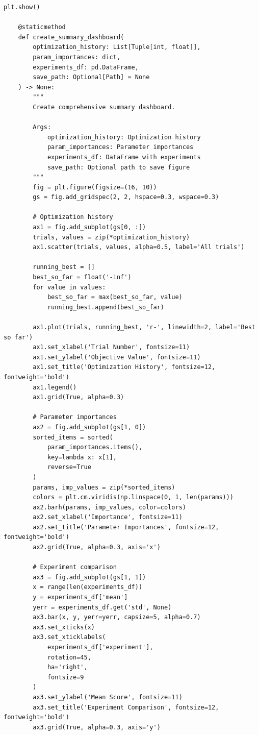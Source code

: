 \begin{lstlisting}[style=python, caption={Experiment dashboard generation}]
        plt.show()

    @staticmethod
    def create_summary_dashboard(
        optimization_history: List[Tuple[int, float]],
        param_importances: dict,
        experiments_df: pd.DataFrame,
        save_path: Optional[Path] = None
    ) -> None:
        """
        Create comprehensive summary dashboard.

        Args:
            optimization_history: Optimization history
            param_importances: Parameter importances
            experiments_df: DataFrame with experiments
            save_path: Optional path to save figure
        """
        fig = plt.figure(figsize=(16, 10))
        gs = fig.add_gridspec(2, 2, hspace=0.3, wspace=0.3)

        # Optimization history
        ax1 = fig.add_subplot(gs[0, :])
        trials, values = zip(*optimization_history)
        ax1.scatter(trials, values, alpha=0.5, label='All trials')

        running_best = []
        best_so_far = float('-inf')
        for value in values:
            best_so_far = max(best_so_far, value)
            running_best.append(best_so_far)

        ax1.plot(trials, running_best, 'r-', linewidth=2, label='Best so far')
        ax1.set_xlabel('Trial Number', fontsize=11)
        ax1.set_ylabel('Objective Value', fontsize=11)
        ax1.set_title('Optimization History', fontsize=12, fontweight='bold')
        ax1.legend()
        ax1.grid(True, alpha=0.3)

        # Parameter importances
        ax2 = fig.add_subplot(gs[1, 0])
        sorted_items = sorted(
            param_importances.items(),
            key=lambda x: x[1],
            reverse=True
        )
        params, imp_values = zip(*sorted_items)
        colors = plt.cm.viridis(np.linspace(0, 1, len(params)))
        ax2.barh(params, imp_values, color=colors)
        ax2.set_xlabel('Importance', fontsize=11)
        ax2.set_title('Parameter Importances', fontsize=12, fontweight='bold')
        ax2.grid(True, alpha=0.3, axis='x')

        # Experiment comparison
        ax3 = fig.add_subplot(gs[1, 1])
        x = range(len(experiments_df))
        y = experiments_df['mean']
        yerr = experiments_df.get('std', None)
        ax3.bar(x, y, yerr=yerr, capsize=5, alpha=0.7)
        ax3.set_xticks(x)
        ax3.set_xticklabels(
            experiments_df['experiment'],
            rotation=45,
            ha='right',
            fontsize=9
        )
        ax3.set_ylabel('Mean Score', fontsize=11)
        ax3.set_title('Experiment Comparison', fontsize=12, fontweight='bold')
        ax3.grid(True, alpha=0.3, axis='y')


\end{lstlisting}
